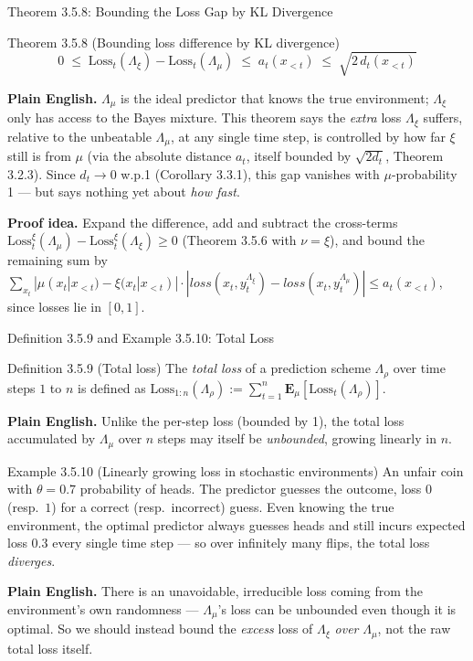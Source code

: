 \documentclass[aspectratio=169,10pt]{beamer}
\newcommand{\Loss}{\mathrm{Loss}}
\newcommand{\loss}{\mathit{loss}}
\begin{document}
\begin{frame}{Theorem 3.5.8: Bounding the Loss Gap by KL Divergence}
  \begin{block}{Theorem 3.5.8 (Bounding loss difference by KL divergence)}
    \[
      0 \; \le \; \Loss_t(\Lambda_\xi) - \Loss_t(\Lambda_\mu) \; \le \; a_t(x_{<t}) \; \le \; \sqrt{2\,d_t(x_{<t})}
    \]
  \end{block}
  \textbf{Plain English.} $\Lambda_\mu$ is the ideal predictor that knows the
  true environment; $\Lambda_\xi$ only has access to the Bayes mixture. This
  theorem says the \emph{extra} loss $\Lambda_\xi$ suffers, relative to the
  unbeatable $\Lambda_\mu$, at any single time step, is controlled by how far
  $\xi$ still is from $\mu$ (via the absolute distance $a_t$, itself bounded
  by $\sqrt{2d_t}$, Theorem 3.2.3). Since $d_t\to 0$ w.p.1 (Corollary 3.3.1),
  this gap vanishes with $\mu$-probability 1 --- but says nothing yet about
  \emph{how fast}.

  \vspace{2mm}
  \textbf{Proof idea.} Expand the difference, add and subtract the
  cross-terms $\Loss_t^\xi(\Lambda_\mu)-\Loss_t^\xi(\Lambda_\xi)\ge 0$
  (Theorem 3.5.6 with $\nu=\xi$), and bound the remaining sum by
  $\sum_{x_t}|\mu(x_t|x_{<t})-\xi(x_t|x_{<t})|\cdot|\loss(x_t,y_t^{\Lambda_\xi})-\loss(x_t,y_t^{\Lambda_\mu})|
  \le a_t(x_{<t})$, since losses lie in $[0,1]$.
\end{frame}

\begin{frame}{Definition 3.5.9 and Example 3.5.10: Total Loss}
  \begin{block}{Definition 3.5.9 (Total loss)}
    The \emph{total loss} of a prediction scheme $\Lambda_\rho$ over time
    steps $1$ to $n$ is defined as
    $\Loss_{1:n}(\Lambda_\rho) := \sum_{t=1}^n \mathbf{E}_\mu[\Loss_t(\Lambda_\rho)]$.
  \end{block}
  \textbf{Plain English.} Unlike the per-step loss (bounded by 1), the total
  loss accumulated by $\Lambda_\mu$ over $n$ steps may itself be
  \emph{unbounded}, growing linearly in $n$.

  \begin{block}{Example 3.5.10 (Linearly growing loss in stochastic environments)}
    An unfair coin with $\theta=0.7$ probability of heads. The predictor
    guesses the outcome, loss $0$ (resp.\ $1$) for a correct (resp.\
    incorrect) guess. Even knowing the true environment, the optimal
    predictor always guesses heads and still incurs expected loss $0.3$
    every single time step --- so over infinitely many flips, the total loss
    \emph{diverges}.
  \end{block}
  \textbf{Plain English.} There is an unavoidable, irreducible loss coming
  from the environment's own randomness --- $\Lambda_\mu$'s loss can be
  unbounded even though it is optimal. So we should instead bound the
  \emph{excess} loss of $\Lambda_\xi$ \emph{over} $\Lambda_\mu$, not the raw
  total loss itself.
\end{frame}
\end{document}
